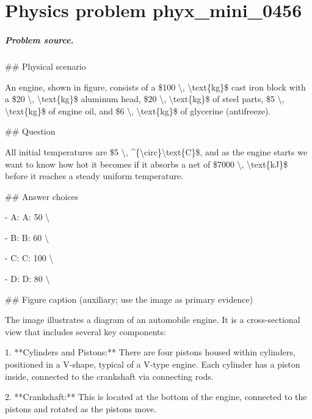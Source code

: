 
\chapter{Physics problem phyx\_mini\_0456}
\label{ch:PhyXMiniProblems_problem_phyx_mini_0456}

\paragraph{Problem source.}
\#\# Physical scenario

An engine, shown in figure, consists of a \$100 \textbackslash{}, \textbackslash{}text\{kg\}\$ cast iron block with a \$20 \textbackslash{}, \textbackslash{}text\{kg\}\$ aluminum head, \$20 \textbackslash{}, \textbackslash{}text\{kg\}\$ of steel parts, \$5 \textbackslash{}, \textbackslash{}text\{kg\}\$ of engine oil, and \$6 \textbackslash{}, \textbackslash{}text\{kg\}\$ of glycerine (antifreeze).

\#\# Question

All initial temperatures are \$5 \textbackslash{}, \textasciicircum{}\{\textbackslash{}circ\}\textbackslash{}text\{C\}\$, and as the engine starts we want to know how hot it becomes if it absorbs a net of \$7000 \textbackslash{}, \textbackslash{}text\{kJ\}\$ before it reaches a steady uniform temperature.

\#\# Answer choices

- A: A: 50 \textbackslash{}

- B: B: 60 \textbackslash{}

- C: C: 100 \textbackslash{}

- D: D: 80 \textbackslash{}

\#\# Figure caption (auxiliary; use the image as primary evidence)

The image illustrates a diagram of an automobile engine. It is a cross-sectional view that includes several key components:

1. **Cylinders and Pistons:** There are four pistons housed within cylinders, positioned in a V-shape, typical of a V-type engine. Each cylinder has a piston inside, connected to the crankshaft via connecting rods.

2. **Crankshaft:** This is located at the bottom of the engine, connected to the pistons and rotated as the pistons move.

